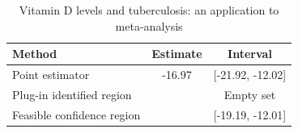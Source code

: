 \begin{table}[!h]
\centering
\caption{\label{tab:vitd_main}Vitamin D levels and tuberculosis: an application to meta-analysis}
\centering
\begin{tabular}[t]{lcc}
\toprule
Method & Estimate & Interval\\
\midrule
Point estimator & -16.97 & {}[-21.92, -12.02]\\
Plug-in identified region &  & Empty set\\
Feasible confidence region &  & {}[-19.19, -12.01]\\
\bottomrule
\end{tabular}
\end{table}
